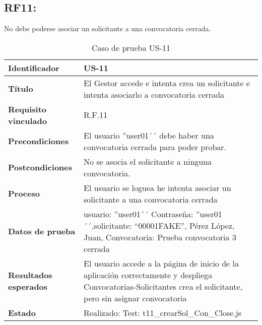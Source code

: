 \subsection{RF11:} No debe poderse asociar un solicitante a una convocatoria cerrada.
\begin{table}[H]
	\centering
	\renewcommand{\arraystretch}{1.3} 
	\begin{tabularx}{\textwidth}{|l|X|}
		\hline
		\textbf{Identificador} & US-11 \\
		\hline
		\textbf{Título} & El Gestor accede e intenta crea un solicitante e intenta asociarlo a convocatoria cerrada\\
		\hline
		\textbf{Requisito vinculado} & R.F.11 \\
		\hline
		\textbf{Precondiciones} & El usuario ''user01´´ debe haber una convocatoria cerrada para poder probar.\\
		\hline
		\textbf{Postcondiciones} & No se asocia el solicitante a ninguna convocatoria. \\
		\hline
		\textbf{Proceso} & El usuario se loguea he intenta asociar un solicitante a una convocatoria cerrada\\
		\hline
		\textbf{Datos de prueba} & usuario: ''user01´´ Contraseña: ''user01´´,solicitante: “00001FAKE”, Pérez López, Juan, Convocatoria: Prueba convocatoria 3 cerrada
		 \\
		\hline
		\textbf{Resultados esperados} & El usuario accede a la página de inicio de la aplicación correctamente y despliega Convocatorias-Solicitantes crea el solicitante, pero sin asignar convocatoria \\
		\hline
		\textbf{Estado} & Realizado: Test: t11\_crearSol\_Con\_Close.js\\
		\hline
	\end{tabularx}
	\caption{Caso de prueba US-11}
	\label{tab:caso_uso11}
\end{table}

